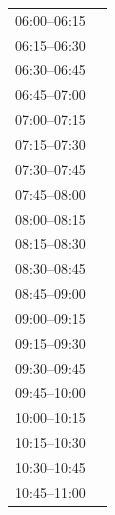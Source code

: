 \documentclass[11pt,a4paper]{article}
\begin{document}
\begin{center}
\begin{adjustbox}{max totalsize={\textwidth}{0.82\textheight},center}
\begin{tabular}{|p{3.6cm}|p{11cm}|}
\cline{1-1}
{\centering\rule{0pt}{2.80ex}06:00--06:15} & {\centering\rule{0pt}{2.80ex}} \\
\cline{1-1}
{\centering\rule{0pt}{2.80ex}06:15--06:30} & {\centering\rule{0pt}{2.80ex}} \\
\cline{1-1}
{\centering\rule{0pt}{2.80ex}06:30--06:45} & {\centering\rule{0pt}{2.80ex}} \\
\cline{1-1}
{\centering\rule{0pt}{2.80ex}06:45--07:00} & {\centering\rule{0pt}{2.80ex}} \\
\cline{1-1}
{\centering\rule{0pt}{2.80ex}07:00--07:15} & {\centering\rule{0pt}{2.80ex}} \\
\cline{1-1}
{\centering\rule{0pt}{2.80ex}07:15--07:30} & {\centering\rule{0pt}{2.80ex}} \\
\cline{1-1}
{\centering\rule{0pt}{2.80ex}07:30--07:45} & {\centering\rule{0pt}{2.80ex}} \\
\cline{1-1}
{\centering\rule{0pt}{2.80ex}07:45--08:00} & {\centering\rule{0pt}{2.80ex}} \\
\cline{1-1}
{\centering\rule{0pt}{2.80ex}08:00--08:15} & {\centering\rule{0pt}{2.80ex}} \\
\cline{1-1}
{\centering\rule{0pt}{2.80ex}08:15--08:30} & {\centering\rule{0pt}{2.80ex}} \\
\cline{1-1}
{\centering\rule{0pt}{2.80ex}08:30--08:45} & {\centering\rule{0pt}{2.80ex}} \\
\cline{1-1}
{\centering\rule{0pt}{2.80ex}08:45--09:00} & {\centering\rule{0pt}{2.80ex}} \\
\cline{1-1}
{\centering\rule{0pt}{2.80ex}09:00--09:15} & {\centering\rule{0pt}{2.80ex}} \\
\cline{1-1}
{\centering\rule{0pt}{2.80ex}09:15--09:30} & {\centering\rule{0pt}{2.80ex}} \\
\cline{1-1}
{\centering\rule{0pt}{2.80ex}09:30--09:45} & {\centering\rule{0pt}{2.80ex}} \\
\cline{1-1}
{\centering\rule{0pt}{2.80ex}09:45--10:00} & {\centering\rule{0pt}{2.80ex}} \\
\cline{1-1}
{\centering\rule{0pt}{2.80ex}10:00--10:15} & {\centering\rule{0pt}{2.80ex}} \\
\cline{1-1}
{\centering\rule{0pt}{2.80ex}10:15--10:30} & {\centering\rule{0pt}{2.80ex}} \\
\cline{1-1}
{\centering\rule{0pt}{2.80ex}10:30--10:45} & {\centering\rule{0pt}{2.80ex}} \\
\cline{1-1}
{\centering\rule{0pt}{2.80ex}10:45--11:00} & {\centering\rule{0pt}{2.80ex}} \\

\end{tabular}
\end{adjustbox}
\end{center}
\end{document}
